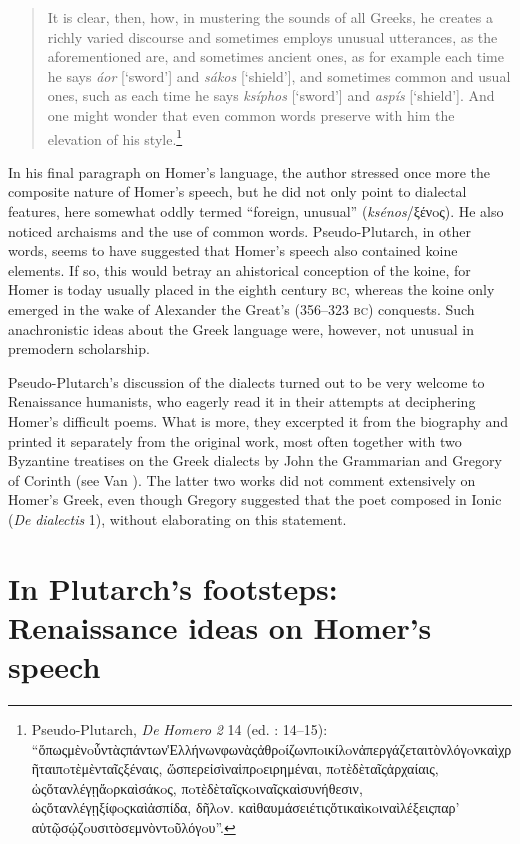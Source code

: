 \begin{quote}
It is clear, then, how, in mustering the sounds of all Greeks, he creates a richly varied discourse and sometimes employs unusual utterances, as the aforementioned are, and sometimes ancient ones, as for example each time he says \textit{áor} [‘sword’] and \textit{sákos} [‘shield’], and sometimes common and usual ones, such as each time he says \textit{ksíphos} [‘sword’] and \textit{aspís} [‘shield’]. And one might wonder that even common words preserve with him the elevation of his style.\footnote{Pseudo-Plutarch, \textit{De} \textit{Homero} \textit{2} 14 (ed. \citealt{Kindstrand1990}: 14–15): “ὅπωςμὲνoὖντὰςπάντωνἙλλήνωνφωνὰςἀθρoίζωνπoικίλoνἀπεργάζεταιτὸνλόγoνκαὶχρῆταιπoτὲμὲνταῖςξέναις, ὥσπερεἰσὶναἱπρoειρημέναι, πoτὲδὲταῖςἀρχαίαις, ὡςὅτανλέγῃἄoρκαὶσάκoς, πoτὲδὲταῖςκoιναῖςκαὶσυνήθεσιν, ὡςὅτανλέγῃξίφoςκαὶἀσπίδα, δῆλoν. καὶθαυμάσειέτιςὅτικαὶκoιναὶλέξειςπαρ’ αὐτῷσῴζoυσιτὸσεμνὸντoῦλόγoυ”.}
\end{quote}

In his final paragraph on Homer’s language, the author stressed once more the composite nature of Homer’s speech, but he did not only point to dialectal features, here somewhat oddly termed “foreign, unusual” (\textit{ksénos}/ξένoς). He also noticed archaisms and the use of common words. Pseudo-Plutarch, in other words, seems to have suggested that Homer’s speech also contained koine elements. If so, this would betray an ahistorical conception of the koine, for Homer is today usually placed in the eighth century \textsc{bc}, whereas the koine only emerged in the wake of Alexander the Great’s (356–323 \textsc{bc}) conquests. Such anachronistic ideas about the Greek language were, however, not unusual in premodern scholarship.

Pseudo-Plutarch’s discussion of the dialects turned out to be very welcome to Renaissance humanists, who eagerly read it in their attempts at deciphering Homer’s difficult poems. What is more, they excerpted it from the biography and printed it separately from the original work, most often together with two Byzantine treatises on the Greek dialects by John the Grammarian and Gregory of Corinth (see Van \citealt{Rooy2018c}). The latter two works did not comment extensively on Homer’s Greek, even though Gregory suggested that the poet composed in Ionic (\textit{De} \textit{dialectis} 1), without elaborating on this statement.

\section{In Plutarch’s footsteps: Renaissance ideas on Homer’s speech}

